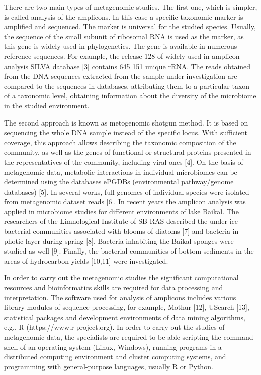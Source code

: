\documentclass[conference,a4paper]{IEEEtran}
\begin{document}
There are two main types of metagenomic studies. The first one, which is simpler, is called analysis of the amplicons. In this case a specific taxonomic marker is amplified and sequenced. The marker is universal for the studied species. Usually, the sequence of the small subunit of ribosomal RNA is used as the marker, as this gene is widely used in phylogenetics. The gene is available in numerous reference sequences. For example, the release 128 of widely used in amplicon analysis SILVA database [3] contains 645 151 unique rRNA. The reads obtained from the DNA sequences extracted from the sample under investigation are compared to the sequences in databases, attributing them to a particular taxon of a taxonomic level, obtaining information about the diversity of the microbiome in the studied environment.

The second approach is known as metogenomic shotgun method. It is based on sequencing the whole DNA sample instead of the specific locus. With sufficient coverage, this approach allows describing the taxonomic composition of the community, as well as the genes of functional or structural proteins presented in the representatives of the community, including viral ones [4]. On the basis of metagenomic data, metabolic interactions in individual microbiomes can be determined using the databases ePGDBs (environmental pathway/genome databases) [5]. In several works, full genomes of individual species were isolated from metagenomic dataset reads [6].
In recent years the amplicon analysis was applied in microbiome studies for different environments of lake Baikal. The researchers of the Limnological Institute of SB RAS described the under-ice bacterial communities associated with blooms of diatoms [7] and bacteria in photic layer during spring [8]. Bacteria inhabiting the Baikal sponges were studied as well [9]. Finally, the bacterial communities of bottom sediments in the areas of hydrocarbon yields [10,11] were investigated.

In order to carry out the metagenomic studies the significant computational resources and bioinformatics skills are required for data processing and interpretation. The software used for analysis of amplicons includes various library modules of sequence processing, for example, Mothur [12], USearch [13], statistical packages and development environments of data mining algorithms, e.g., R (https://www.r-project.org). In order to carry out the studies of metagenomic data, the specialists are required to be able scripting the command shell of an operating system (Linux, Windows), running programs in a distributed computing environment and cluster computing systems, and programming with general-purpose languages, usually R or Python.
\end{document}
